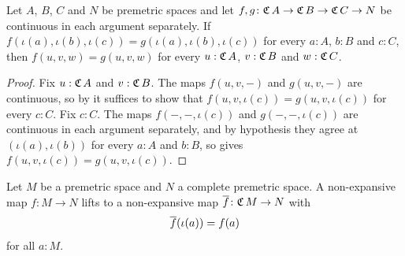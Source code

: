 \begin{lemma}
  \label{continuous3Eq}
  Let $A$, $B$, $C$ and $N$ be premetric spaces and let $f, g \colon \mathfrak{C}\,A \to \mathfrak{C}\,B \to \mathfrak{C}\,C \to N$ be continuous in each argument separately. If $f(\iota(a), \iota(b), \iota(c)) = g(\iota(a), \iota(b), \iota(c))$ for every $a : A$, $b : B$ and $c : C$, then $f(u, v, w) = g(u, v, w)$ for every $u : \mathfrak{C}\,A$, $v : \mathfrak{C}\,B$ and $w : \mathfrak{C}\,C$.
\end{lemma}
\begin{proof}
  Fix $u : \mathfrak{C}\,A$ and $v : \mathfrak{C}\,B$. The maps $f(u, v, -)$ and $g(u, v, -)$ are continuous, so by  it suffices to show that $f(u, v, \iota(c)) = g(u, v, \iota(c))$ for every $c : C$. Fix $c : C$. The maps $f(-, -, \iota(c))$ and $g(-, -, \iota(c))$ are continuous in each argument separately, and by hypothesis they agree at $(\iota(a), \iota(b))$ for every $a : A$ and $b : B$, so  gives $f(u, v, \iota(c)) = g(u, v, \iota(c))$.
\end{proof}

\begin{theorem}
  \label{liftNE}
  Let $M$ be a premetric space and $N$ a complete premetric space. A non-expansive map $f \colon M \to N$ lifts to a non-expansive map $\overline{f} \colon \mathfrak{C}\,M \to N$ with
  \[
    \overline{f}(\iota(a)) = f(a)
  \]
  for all $a : M$.
\end{theorem}

